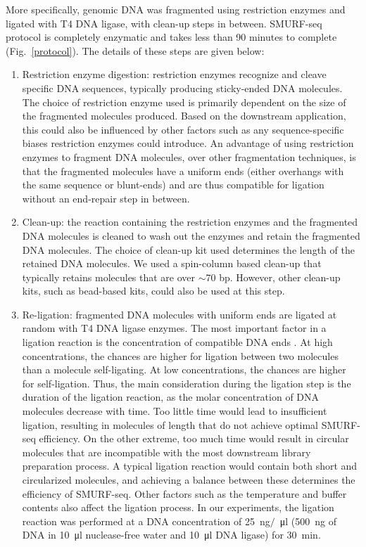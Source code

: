 More specifically, genomic DNA was fragmented using restriction enzymes
and ligated with T4 DNA ligase, with clean-up steps in between.
SMURF-seq protocol is completely enzymatic and takes less than 90
minutes to complete (Fig.~\ref{protocol}).  The details of these steps
are given below:
\begin{enumerate}
\item Restriction enzyme digestion: restriction enzymes recognize
  and cleave specific DNA sequences, typically producing sticky-ended DNA
  molecules.
  The choice of restriction enzyme used is primarily dependent on the
  size of the fragmented molecules produced. Based on the downstream
  application, this could also be influenced by other factors such as
  any sequence-specific biases restriction enzymes could introduce.
  An advantage of using restriction enzymes to fragment DNA molecules,
  over other fragmentation techniques, is that the fragmented molecules
  have a uniform ends (either overhangs with the same sequence or
  blunt-ends) and are thus compatible for ligation without an end-repair
  step in between.

\item Clean-up: the reaction containing the restriction enzymes and the
  fragmented DNA molecules is cleaned to wash out the enzymes and retain
  the fragmented DNA molecules. The choice of clean-up kit used determines
  the length of the retained DNA molecules. We used a spin-column
  based clean-up that typically retains molecules that are over $\sim$70
  bp. However, other clean-up kits, such as bead-based kits, could also be
  used at this step.

\item Re-ligation: fragmented DNA molecules with uniform ends are
  ligated at random with T4 DNA ligase enzymes.
  The most important factor in a ligation reaction is the
  concentration of compatible DNA ends \citep{dugaiczyk1975ligation}. At
  high concentrations, the chances are higher for ligation between two
  molecules than a molecule self-ligating. At low concentrations, the
  chances are higher for self-ligation.
  Thus, the main consideration during the ligation step is the
  duration of the ligation reaction, as the molar concentration of DNA
  molecules decrease with time. Too little time would lead to insufficient
  ligation, resulting in molecules of length that do not achieve optimal
  SMURF-seq efficiency. On the other extreme, too much time would result
  in circular molecules that are incompatible with the most downstream
  library preparation process. A typical ligation reaction would contain
  both short and circularized molecules, and achieving a balance between
  these determines the efficiency of SMURF-seq.
  Other factors such as the temperature and buffer contents also affect
  the ligation process.
  In our experiments, the ligation reaction was performed at a DNA
  concentration of \SI{25}{\nano\gram}$/$\SI{}{\micro\litre}
  (\SI{500}{\nano\gram} of DNA in \SI{10}{\micro\litre} nuclease-free
  water and \SI{10}{\micro\litre} DNA ligase) for \SI{30}{\minute}.


\end{enumerate}
